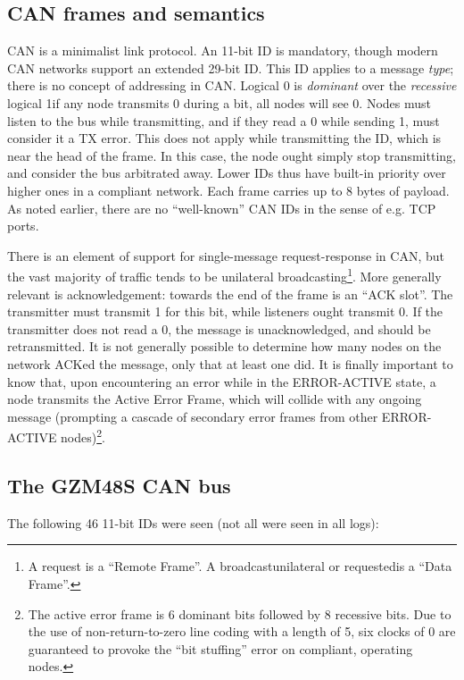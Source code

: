 \documentclass[letterpaper,10pt]{article}
\begin{document}
\subsection{CAN frames and semantics}
CAN is a minimalist link protocol. An 11-bit ID is mandatory, though modern CAN
networks support an extended 29-bit ID. This ID applies to a message \textit{type};
there is no concept of addressing in CAN. Logical 0 is \textit{dominant} over
the \textit{recessive} logical 1{\textemdash}if any node transmits 0 during a
bit, all nodes will see 0. Nodes must listen to the bus while transmitting, and
if they read a 0 while sending 1, must consider it a TX error. This does not
apply while transmitting the ID, which is near the head of the frame. In this
case, the node ought simply stop transmitting, and consider the bus arbitrated
away. Lower IDs thus have built-in priority over higher ones in a compliant
network. Each frame carries up to 8 bytes of payload. As noted earlier, there are
no ``well-known'' CAN IDs in the sense of e.g. TCP ports.

There is an element of support for single-message request-response in CAN, but
the vast majority of traffic tends to be unilateral broadcasting\footnote{A
request is a ``Remote Frame''. A broadcast{\textemdash}unilateral or
requested{\textemdash}is a ``Data Frame''.}. More generally relevant is
acknowledgement: towards the end of the frame is an ``ACK slot''. The
transmitter must transmit 1 for this bit, while listeners ought
transmit 0. If the transmitter does not read a 0, the message is unacknowledged,
and should be retransmitted. It is not generally possible to determine how many nodes on
the network ACKed the message, only that at least one did. It is finally important to
know that, upon encountering an error while in the ERROR-ACTIVE state, a node transmits
the Active Error Frame, which will collide with any ongoing message (prompting
a cascade of secondary error frames from other ERROR-ACTIVE nodes)\footnote{The
active error frame is 6 dominant bits followed by 8 recessive bits. Due to the
use of non-return-to-zero line coding with a length of 5, six clocks of 0 are
guaranteed to provoke the ``bit stuffing'' error on compliant, operating nodes.}.
\subsection{The GZM48S CAN bus}
The following 46 11-bit IDs were seen (not all were seen in all logs):
\end{document}
